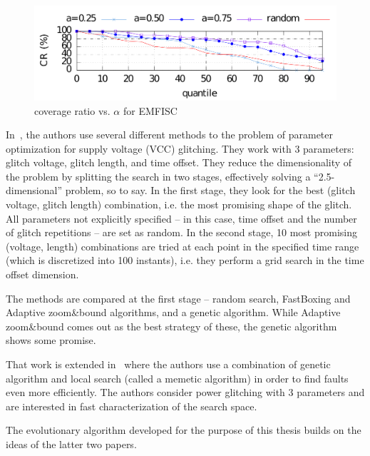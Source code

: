 \documentclass[times, utf8, diplomski]{fer}
\begin{document}
\begin{figure}[htb]
    \centering
    \includegraphics{images/emfisc.png}
    \caption{coverage ratio vs. $\alpha$ for EMFISC}
    \label{fig:emfisc}
\end{figure}


In~\cite{GlitchItIfYouCan}, the authors use several different methods to the
problem of parameter optimization for supply voltage (VCC) glitching. They work
with 3 parameters: glitch voltage, glitch length, and time offset. They reduce
the dimensionality of the problem by splitting the search in two stages,
effectively solving a ``2.5-dimensional'' problem, so to say. In the first stage,
they look for the best (glitch voltage, glitch length) combination, i.e. the
most promising shape of the glitch. All parameters not explicitly specified
 -- in this case, time offset and the number of glitch repetitions -- are
set as random. In the second stage, 10 most promising (voltage, length)
combinations are tried at each point in the specified time range (which is
discretized into 100 instants), i.e. they perform a grid search in the time
offset dimension.

The methods are compared at the first stage -- random search, FastBoxing and
Adaptive zoom\&bound algorithms, and a genetic algorithm. While Adaptive
zoom\&bound comes out as the best strategy of these, the genetic algorithm
shows some promise. 

That work is extended in~\cite{FI_memetic} where the authors use a combination of
genetic algorithm and local search (called a memetic algorithm) in order to find
faults even more efficiently. The authors consider power glitching with 3
parameters and are interested in fast characterization of the search space.


The evolutionary algorithm developed for the purpose of this thesis builds on
the ideas of the latter two papers.
\end{document}
